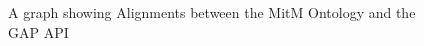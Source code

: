 \begin{figure}
\begin{center}
{\begin{tikzpicture}
%
%
%
%
%
%
%
%
%
%
%

\end{tikzpicture}
}
\end{center}
\caption{A graph showing Alignments between the MitM Ontology and the GAP API}\label{fig:graph}
\end{figure}
